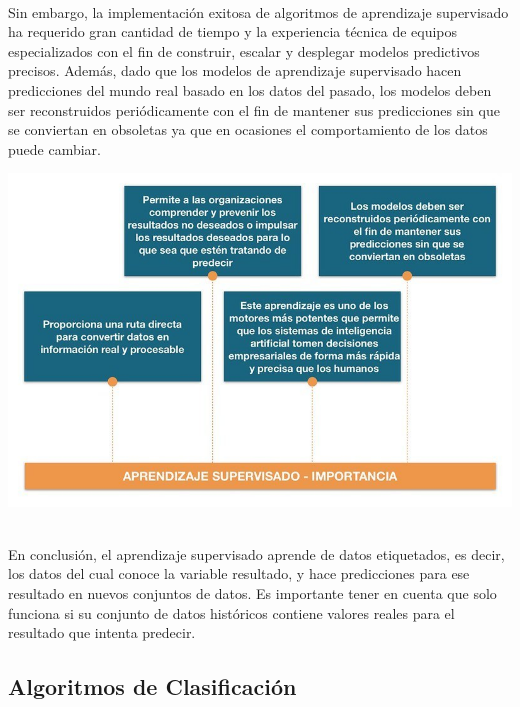 \documentclass[11pt,a4paper]{article}
\begin{document}
            \\Sin embargo, la implementación exitosa de algoritmos de aprendizaje supervisado ha requerido gran cantidad de tiempo y la experiencia técnica de equipos especializados con el fin de construir, escalar y desplegar modelos predictivos precisos. Además, dado que los modelos de aprendizaje supervisado hacen predicciones del mundo real basado en los datos del pasado, los modelos deben ser reconstruidos periódicamente con el fin de mantener sus predicciones sin que se conviertan en obsoletas ya que en ocasiones el comportamiento de los datos puede cambiar.\\
            
            \begin{center}	\includegraphics[scale=1.0]{./Imagenes/AprendSuperImportancia}
    		\end{center}
    		
    		\\En conclusión, el aprendizaje supervisado aprende de datos etiquetados, es decir, los datos del cual conoce la variable resultado, y hace predicciones para ese resultado en nuevos conjuntos de datos. Es importante tener en cuenta que solo funciona si su conjunto de datos históricos contiene valores reales para el resultado que intenta predecir.\\

	        \subsection{Algoritmos de Clasificación}
	        
\end{document}
